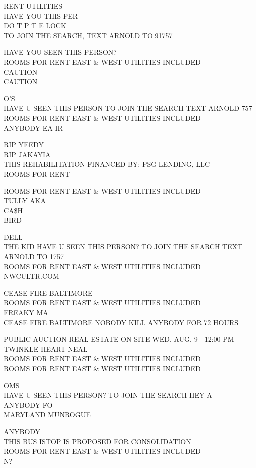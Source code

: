\documentclass[10pt,letterpaper]{article}
\begin{document}
RENT UTILITIES\\
HAVE YOU THIS PER\\
DO T P T E LOCK\\
TO JOIN THE SEARCH, TEXT ARNOLD TO 91757

HAVE YOU SEEN THIS PERSON?\\
ROOMS FOR RENT EAST \& WEST UTILITIES INCLUDED\\
CAUTION\\
CAUTION

O'S\\
HAVE U SEEN THIS PERSON TO JOIN THE SEARCH TEXT ARNOLD 757\\
ROOMS FOR RENT EAST \& WEST UTILITIES INCLUDED\\
ANYBODY EA IR

RIP YEEDY\\
RIP JAKAYIA\\
THIS REHABILITATION FINANCED BY: PSG LENDING, LLC\\
ROOMS FOR RENT

ROOMS FOR RENT EAST \& WEST UTILITIES INCLUDED\\
TULLY AKA\\
CA\$H\\
BIRD

DELL\\
THE KID HAVE U SEEN THIS PERSON?  TO JOIN THE SEARCH TEXT ARNOLD TO 1757\\
ROOMS FOR RENT EAST \& WEST UTILITIES INCLUDED\\
NWCULTR.COM

CEASE FIRE BALTIMORE\\
ROOMS FOR RENT EAST \& WEST UTILITIES INCLUDED\\
FREAKY MA\\
CEASE FIRE BALTIMORE NOBODY KILL ANYBODY FOR 72 HOURS

PUBLIC AUCTION REAL ESTATE ON{-}SITE WED. AUG. 9 {-} 12:00 PM\\
TWINKLE HEART NEAL\\
ROOMS FOR RENT EAST \& WEST UTILITIES INCLUDED\\
ROOMS FOR RENT EAST \& WEST UTILITIES INCLUDED

OMS\\
HAVE U SEEN THIS PERSON?  TO JOIN THE SEARCH HEY A\\
ANYBODY FO\\
MARYLAND MUNROGUE

ANYBODY\\
THIS BUS ISTOP IS PROPOSED FOR CONSOLIDATION\\
ROOMS FOR RENT EAST \& WEST UTILITIES INCLUDED\\
N?
\end{document}
